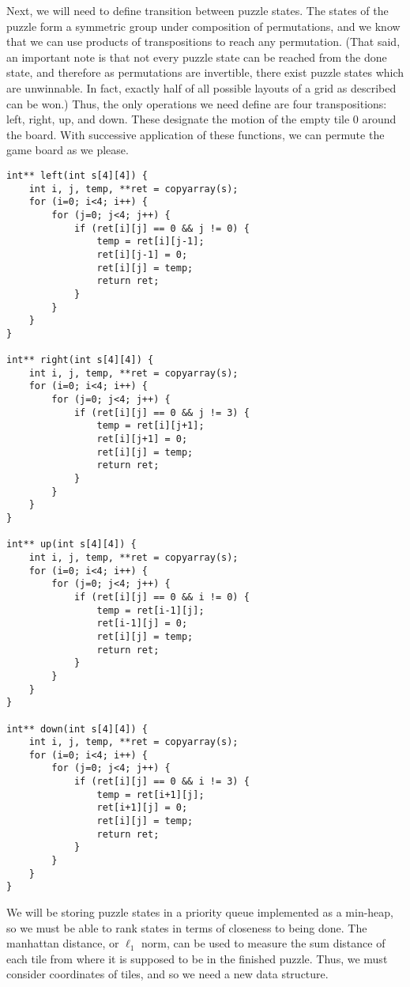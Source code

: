 \documentclass[11pt]{article}
\begin{document}
Next, we will need to define transition between puzzle states. The
states of the puzzle form a symmetric group under composition of
permutations, and we know that we can use products of transpositions
to reach any permutation. (That said, an important note is that not
every puzzle state can be reached from the done state, and therefore
as permutations are invertible, there exist puzzle states which are
unwinnable. In fact, exactly half of all possible layouts of a grid as
described can be won.) Thus, the only operations we need define are
four transpositions: left, right, up, and down. These designate the
motion of the empty tile 0 around the board. With successive
application of these functions, we can permute the game board as we
please.

\begin{verbatim}
int** left(int s[4][4]) {
    int i, j, temp, **ret = copyarray(s);
    for (i=0; i<4; i++) {
        for (j=0; j<4; j++) {
            if (ret[i][j] == 0 && j != 0) {
                temp = ret[i][j-1];
                ret[i][j-1] = 0;
                ret[i][j] = temp;
                return ret;
            }
        }
    }
}

int** right(int s[4][4]) {
    int i, j, temp, **ret = copyarray(s);
    for (i=0; i<4; i++) {
        for (j=0; j<4; j++) {
            if (ret[i][j] == 0 && j != 3) {
                temp = ret[i][j+1];
                ret[i][j+1] = 0;
                ret[i][j] = temp;
                return ret;
            }
        }
    }
}

int** up(int s[4][4]) {
    int i, j, temp, **ret = copyarray(s);
    for (i=0; i<4; i++) {
        for (j=0; j<4; j++) {
            if (ret[i][j] == 0 && i != 0) {
                temp = ret[i-1][j];
                ret[i-1][j] = 0;
                ret[i][j] = temp;
                return ret;
            }
        }
    }
}

int** down(int s[4][4]) {
    int i, j, temp, **ret = copyarray(s);
    for (i=0; i<4; i++) {
        for (j=0; j<4; j++) {
            if (ret[i][j] == 0 && i != 3) {
                temp = ret[i+1][j];
                ret[i+1][j] = 0;
                ret[i][j] = temp;
                return ret;
            }
        }
    }
}
\end{verbatim}

We will be storing puzzle states in a priority queue implemented as a
min-heap, so we must be able to rank states in terms of closeness to
being done. The manhattan distance, or $\ell_1$ norm, can be used to
measure the sum distance of each tile from where it is supposed to be
in the finished puzzle. Thus, we must consider coordinates of tiles,
and so we need a new data structure.
\end{document}
